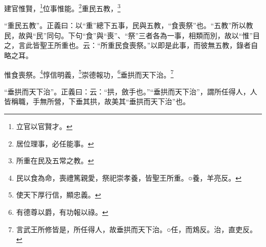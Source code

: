 建官惟賢，\footnote{立官以官賢才。}位事惟能。\footnote{居位理事，必任能事。}重民五教，\footnote{所重在民及五常之教。}

{\noindent\shu{}\fzkt “重民五教”。正義曰：以“重”總下五事，民與五教，“食喪祭”也。“五教”所以教民，故與“民”同句。下句“食”與“喪”、“祭”三者各為一事，相類而別，故以“惟”目之，言此皆聖王所重也。云：“所重民食喪祭。”以即是此事，而彼無五教，錄者自略之耳。 \par}

惟食喪祭。\footnote{民以食為命，喪禮篤親愛，祭祀崇孝養，皆聖王所重。○養，羊亮反。}惇信明義，\footnote{使天下厚行信，顯忠義。}崇德報功，\footnote{有德尊以爵，有功報以祿。}垂拱而天下治。\footnote{言武王所修皆是，所任得人，故垂拱而天下治。○任，而鴆反。治，直吏反。}

{\noindent\shu{}\fzkt “垂拱而天下治”。正義曰：云：“拱，斂手也。”“垂拱而天下治”，謂所任得人，人皆稱職，手無所營，下垂其拱，故美其“垂拱而天下治”也。 \par}

